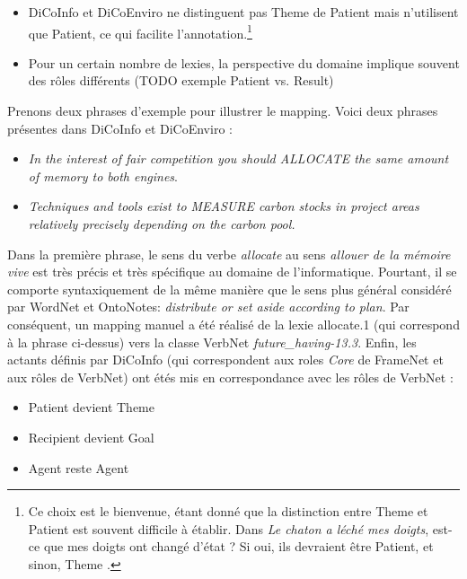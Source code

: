 \begin{itemize}

    \item DiCoInfo et DiCoEnviro ne distinguent pas Theme de Patient mais
n'utilisent que Patient, ce qui facilite l'annotation.\footnote{Ce choix est le
bienvenue, étant donné que la distinction entre Theme et Patient est souvent
difficile à établir. Dans \textit{Le chaton a léché mes doigts}, est-ce que mes
doigts ont changé d'état ? Si oui, ils devraient être Patient, et sinon, Theme
\citep[p.~5]{palmer2010semantic}.}

    \item Pour un certain nombre de lexies, la perspective du domaine implique
souvent des rôles différents (TODO exemple Patient vs. Result)

\end{itemize}

Prenons deux phrases d'exemple pour illustrer le mapping. Voici deux phrases
présentes dans DiCoInfo et DiCoEnviro :

\begin{itemize}

    \item \textit{In the interest of fair competition you should ALLOCATE the
        same amount of memory to both engines}.

    \item \textit{Techniques and tools exist to MEASURE carbon stocks in project areas
        relatively precisely depending on the carbon pool.}

\end{itemize}

Dans la première phrase, le sens du verbe \textit{allocate} au sens
\textit{allouer de la mémoire vive} est très précis et très spécifique au domaine
de l'informatique. Pourtant, il se comporte syntaxiquement de la même manière
que le sens plus général considéré par WordNet et OntoNotes: \textit{distribute
or set aside according to plan}. Par conséquent, un mapping manuel a été
réalisé de la lexie allocate.1 (qui correspond à la phrase ci-dessus) vers la
classe VerbNet \textit{future\_having-13.3}. Enfin, les actants définis par
DiCoInfo (qui correspondent aux roles \textit{Core} de FrameNet et aux rôles de
VerbNet) ont étés mis en correspondance avec les rôles de VerbNet :

\begin{itemize}
    \item Patient devient Theme
    \item Recipient devient Goal
    \item Agent reste Agent
\end{itemize}

